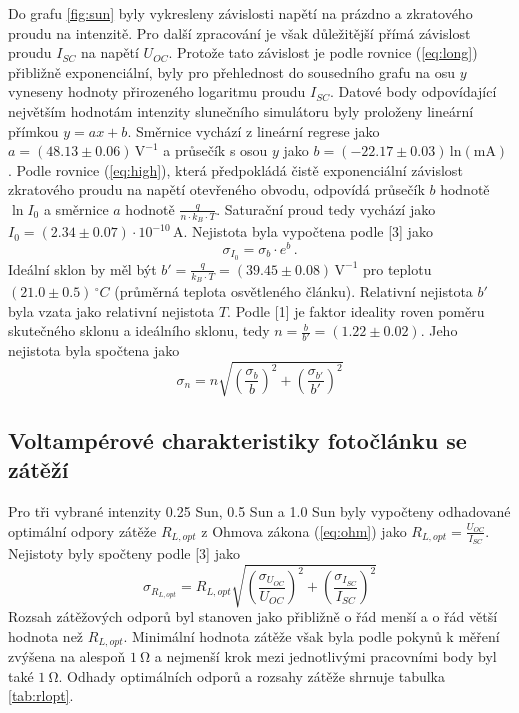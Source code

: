 \documentclass{../concepts/prepareprotokol} %
\begin{document}
Do grafu \ref{fig:sun} byly vykresleny závislosti napětí na prázdno a zkratového proudu na intenzitě. Pro další zpracování je však důležitější přímá závislost proudu $I_{SC}$ na napětí $U_{OC}$. Protože tato závislost je podle rovnice (\ref{eq:long}) přibližně exponenciální, byly pro přehlednost do sousedního grafu na osu $y$ vyneseny hodnoty přirozeného logaritmu proudu $I_{SC}$. Datové body odpovídající největším hodnotám intenzity slunečního simulátoru byly proloženy lineární přímkou $y = ax + b$. Směrnice vychází z lineární regrese jako $a = (48.13 \pm 0.06) \, \mathrm{V^{-1}}$ a průsečík s osou $y$ jako $b = (-22.17 \pm 0.03) \, \mathrm{ln(mA)}$. Podle rovnice (\ref{eq:high}), která předpokládá čistě exponenciální závislost zkratového proudu na napětí otevřeného obvodu, odpovídá průsečík $b$ hodnotě $\ln{I_0}$ a směrnice $a$ hodnotě $\frac{q}{n \cdot k_B \cdot T}$. Saturační proud tedy vychází jako $I_0 = (2.34 \pm 0.07) \cdot 10^{-10} \, \si{\ampere}$. Nejistota byla vypočtena podle [3] jako
\begin{equation}
    \sigma_{I_0} = \sigma_b \cdot e^{b} \, .
\end{equation}
Ideální sklon by měl být $b' = \frac{q}{k_B \cdot T} = (39.45 \pm 0.08) \, \mathrm{V^{-1}}$ pro teplotu $(21.0 \pm 0.5) \, \si{^\circ C}$ (průměrná teplota osvětleného článku). Relativní nejistota $b'$ byla vzata jako relativní nejistota $T$. Podle [1] je faktor ideality roven poměru skutečného sklonu a ideálního sklonu, tedy $n = \frac{b}{b'} = (1.22 \pm 0.02)$. Jeho nejistota byla spočtena jako 
\begin{equation}
    \sigma_n = n \sqrt{\left(\frac{\sigma_b}{b}\right)^2 + \left(\frac{\sigma_{b'}}{b'}\right)^2}
\end{equation}

\subsection{Voltampérové charakteristiky fotočlánku se zátěží}

Pro tři vybrané intenzity 0.25 Sun, 0.5 Sun a 1.0 Sun byly vypočteny odhadované optimální odpory zátěže $R_{L,opt}$ z Ohmova zákona (\ref{eq:ohm}) jako $R_{L,opt} = \frac{U_{OC}}{I_{SC}}$. Nejistoty byly spočteny podle [3] jako
\begin{equation}
    \sigma_{R_{L,opt}} = R_{L,opt} \sqrt{\left(\frac{\sigma_{U_{OC}}}{U_{OC}}\right)^2 + \left(\frac{\sigma_{I_{SC}}}{I_{SC}}\right)^2}
\end{equation}
Rozsah zátěžových odporů byl stanoven jako přibližně o řád menší a o řád větší hodnota než $R_{L,opt}$. Minimální hodnota zátěže však byla podle pokynů k měření zvýšena na alespoň $\SI{1}{\ohm}$ a nejmenší krok mezi jednotlivými pracovními body byl také $\SI{1}{\ohm}$. Odhady optimálních odporů a rozsahy zátěže shrnuje tabulka \ref{tab:rlopt}.
\end{document}

